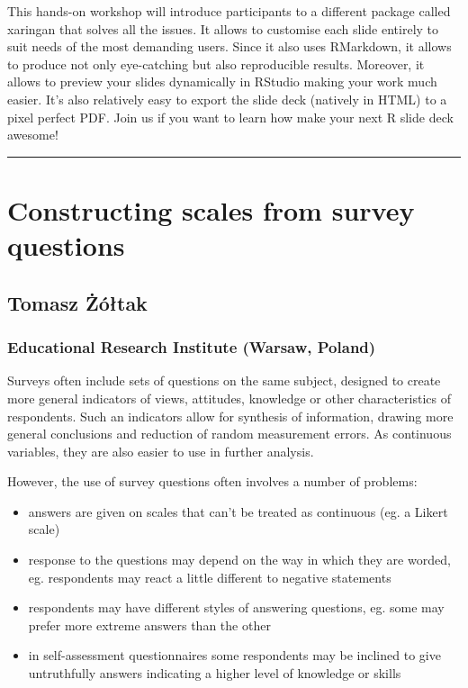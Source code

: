 \documentclass [12pt]{article}
\begin{document}
This hands-on workshop will introduce participants to a different package called xaringan that solves all the issues. It allows to customise each slide entirely to suit needs of the most demanding users. Since it also uses RMarkdown, it allows to produce not only eye-catching but also reproducible results. Moreover, it allows to preview your slides dynamically in RStudio making your work much easier. It’s also relatively easy to export the slide deck (natively in HTML) to a pixel perfect PDF. Join us if you want to learn how make your next R slide deck awesome!

\noindent\rule{\textwidth}{1pt}
\section{Constructing scales from survey questions}
\subsection*{Tomasz	Żółtak}
\subsubsection*{Educational Research Institute (Warsaw, Poland)}

Surveys often include sets of questions on the same subject, designed to create more general indicators of views, attitudes, knowledge or other characteristics of respondents. Such an indicators allow for synthesis of information, drawing more general conclusions and reduction of random measurement errors. As continuous variables, they are also easier to use in further analysis.

However, the use of survey questions often involves a number of problems:
\begin{itemize}
\setlength\itemsep{.15em}
\item answers are given on scales that can’t be treated as continuous (eg. a Likert scale)
\item response to the questions may depend on the way in which they are worded, eg. respondents may react a little different to negative statements
\item respondents may have different styles of answering questions, eg. some may prefer more extreme answers than the other
\item in self-assessment questionnaires some respondents may be inclined to give untruthfully answers indicating a higher level of knowledge or skills
\end{itemize}
\end{document}
